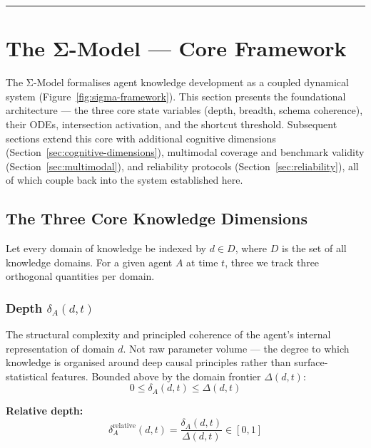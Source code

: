 \documentclass[11pt,a4paper]{article}
\begin{document}
\noindent\rule{\linewidth}{0.4pt}

\section{The Σ-Model --- Core Framework}\label{sec:core-framework}

The Σ-Model formalises agent knowledge development as a coupled
dynamical system (Figure~\ref{fig:sigma-framework}). This section presents the foundational architecture
--- the three core state variables (depth, breadth, schema coherence),
their ODEs, intersection activation, and the shortcut threshold.
Subsequent sections extend this core with additional cognitive
dimensions (Section~\ref{sec:cognitive-dimensions}), multimodal coverage
and benchmark validity (Section~\ref{sec:multimodal}), and reliability
protocols (Section~\ref{sec:reliability}), all of which couple back into
the system established here.

\subsection{The Three Core Knowledge Dimensions}\label{sec:three-core}

Let every domain of knowledge be indexed by $d \in D$, where $D$ is the
set of all knowledge domains. For a given agent $A$ at time $t$, three
we track three orthogonal quantities per domain.

\subsubsection{Depth \texorpdfstring{$\delta_A(d,t)$}{delta\_A(d,t)}}\label{sec:depth}

The structural complexity and principled coherence of the agent's
internal representation of domain $d$. Not raw parameter volume ---
the degree to which knowledge is organised around deep causal principles
rather than surface-statistical features. Bounded above by the domain
frontier $\Delta(d,t)$:
\begin{equation}\label{eq:depth-bounds}
0 \leq \delta_A(d,t) \leq \Delta(d,t)
\end{equation}

\textbf{Relative depth:}
\begin{equation}\label{eq:relative-depth}
\delta_A^{\text{relative}}(d,t) = \frac{\delta_A(d,t)}{\Delta(d,t)} \in [0,1]
\end{equation}
\end{document}
